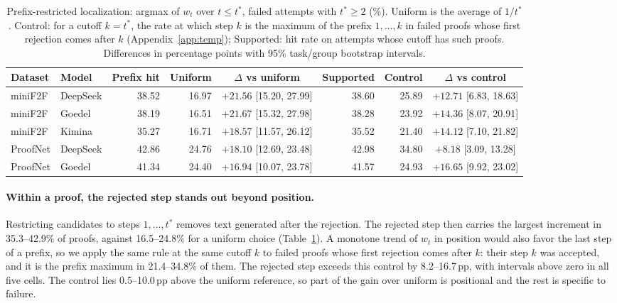 \begin{table}[t]
\caption{Prefix-restricted localization: argmax of $w_t$ over $t\le t^*$, failed attempts with $t^*\ge2$ (\%). Uniform is the average of $1/t^*$. Control: for a cutoff $k=t^*$, the rate at which step $k$ is the maximum of the prefix $1,\dots,k$ in failed proofs whose first rejection comes after $k$ (Appendix~\ref{app:temp}); Supported: hit rate on attempts whose cutoff has such proofs. Differences in percentage points with 95\% task/group bootstrap intervals.}
\label{tab:prefix}
\begin{center}
\scriptsize
\setlength{\tabcolsep}{3pt}
\begin{tabular}{llrrcrrc}
\toprule
Dataset & Model & Prefix hit & Uniform & $\Delta$ vs uniform & Supported & Control & $\Delta$ vs control\\
\midrule
miniF2F & DeepSeek & 38.52 & 16.97 & $+21.56$ [15.20, 27.99] & 38.60 & 25.89 & $+12.71$ [6.83, 18.63]\\
miniF2F & Goedel & 38.19 & 16.51 & $+21.67$ [15.32, 27.98] & 38.28 & 23.92 & $+14.36$ [8.07, 20.91]\\
miniF2F & Kimina & 35.27 & 16.71 & $+18.57$ [11.57, 26.12] & 35.52 & 21.40 & $+14.12$ [7.10, 21.82]\\
ProofNet & DeepSeek & 42.86 & 24.76 & $+18.10$ [12.69, 23.48] & 42.98 & 34.80 & $+8.18$ [3.09, 13.28]\\
ProofNet & Goedel & 41.34 & 24.40 & $+16.94$ [10.07, 23.78] & 41.57 & 24.93 & $+16.65$ [9.92, 23.02]\\
\bottomrule
\end{tabular}
\end{center}
\end{table}

\paragraph{Within a proof, the rejected step stands out beyond position.} Restricting candidates to steps $1,\dots,t^*$ removes text generated after the rejection. The rejected step then carries the largest increment in 35.3--42.9\% of proofs, against 16.5--24.8\% for a uniform choice (Table~\ref{tab:prefix}). A monotone trend of $w_t$ in position would also favor the last step of a prefix, so we apply the same rule at the same cutoff $k$ to failed proofs whose first rejection comes after $k$: their step $k$ was accepted, and it is the prefix maximum in 21.4--34.8\% of them. The rejected step exceeds this control by 8.2--16.7\,pp, with intervals above zero in all five cells. The control lies 0.5--10.0\,pp above the uniform reference, so part of the gain over uniform is positional and the rest is specific to failure.

